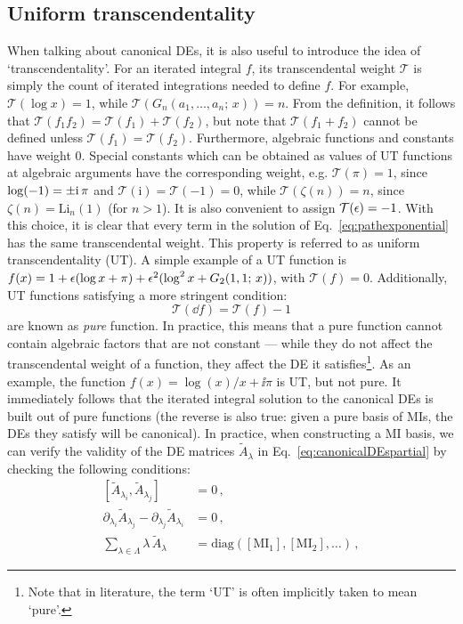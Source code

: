 \documentclass[main.tex]{subfiles}
\begin{document}
\subsection{Uniform transcendentality} \label{sec:UT}
When talking about canonical DEs, it is also useful to introduce the idea of `transcendentality'. For an iterated integral $f$, its transcendental weight $\mathcal{T}$ is simply the count of iterated integrations needed to define $f$\cite{Henn:2013pwa}. For example, $\mathcal{T}(\log x) = 1$, while $\mathcal{T}(G_n(a_1, \ldots, a_n;\, x)) = n$. From the definition, it follows that $\mathcal{T}(f_1 f_2) = \mathcal{T}(f_1) + \mathcal{T}(f_2)$, but note that $\mathcal{T}(f_1 + f_2)$ cannot be defined unless $\mathcal{T}(f_1) = \mathcal{T}(f_2)$. Furthermore, algebraic functions and constants have weight 0. Special constants which can be obtained as values of UT functions at algebraic arguments have the corresponding weight, e.g. $\mathcal{T}(\pi) = 1$, since $\log (-1) = \pm \mathrm{i}\, \pi$ and $\mathcal{T}(\mathrm{i}) = \mathcal{T}(-1) = 0$, while $\mathcal{T}(\zeta(n)) = n$, since $\zeta(n) = \text{Li}_n(1)$ (for $n>1$). It is also convenient to assign $\mathcal{T}(\epsilon)=-1$. With this choice, it is clear that every term in the solution of Eq.~\ref{eq:pathexponential} has the same transcendental weight. This property is referred to as uniform transcendentality (UT). A simple example of a UT function is $f(x) = 1 + \epsilon (\log x + \pi) + \epsilon^2 (\log^2 x + G_2(1, 1;\, x))$, with $\mathcal{T}(f) = 0$. Additionally, 
UT functions satisfying a more stringent condition:
\begin{equation} \label{eq:purecondition}
    \mathcal{T}(\dd f) = \mathcal{T}(f) - 1
\end{equation}
are known as \textit{pure} function. In practice, this means that a pure function cannot contain algebraic factors that are not constant --- while they do not affect the transcendental weight of a function, they affect the DE it satisfies\footnote{Note that in literature, the term `UT' is often implicitly taken to mean `pure'.}. As an example, the function $f(x) = \log(x)/x + \ii \pi$ is UT, but not pure. It immediately follows that the iterated integral solution to the canonical DEs is built out of pure functions (the reverse is also true: given a pure basis of MIs, the DEs they satisfy will be canonical). In practice, when constructing a MI basis, we can verify the validity of the DE matrices $\tilde{A}_\lambda$ in Eq.~\ref{eq:canonicalDEspartial} by checking the following conditions:
\begin{subequations}
\begin{align}
    [ \tilde{A}_{\lambda_i}, \tilde{A}_{\lambda_j}] &= 0\,, \\
    \partial_{\lambda_i} \tilde{A}_{\lambda_j} - \partial_{\lambda_j} \tilde{A}_{\lambda_i} &= 0\,, \\
    \sum_{\lambda \in \Lambda} \lambda \, \tilde{A}_\lambda &= \text{diag}([\text{MI}_1], [\text{MI}_2], \ldots)\,,
\end{align}
\end{subequations}
\end{document}
